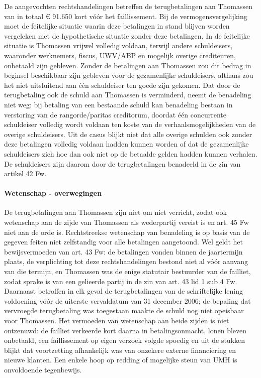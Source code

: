 \documentclass[
  dutch,
  a4paper,
]{article}
\begin{document}
De aangevochten rechtshandelingen betreffen de terugbetalingen aan Thomassen van in totaal € 91.650 kort vóór het faillissement. Bij de vermogensvergelijking moet de feitelijke situatie waarin deze betalingen in stand blijven worden vergeleken met de hypothetische situatie zonder deze betalingen. In de feitelijke situatie is Thomassen vrijwel volledig voldaan, terwijl andere schuldeisers, waaronder werknemers, fiscus, UWV/ABP en mogelijk overige crediteuren, onbetaald zijn gebleven. Zonder de betalingen aan Thomassen zou dit bedrag in beginsel beschikbaar zijn gebleven voor de gezamenlijke schuldeisers, althans zou het niet uitsluitend aan één schuldeiser ten goede zijn gekomen. Dat door de terugbetaling ook de schuld aan Thomassen is verminderd, neemt de benadeling niet weg: bij betaling van een bestaande schuld kan benadeling bestaan in verstoring van de rangorde/paritas creditorum, doordat één concurrente schuldeiser volledig wordt voldaan ten koste van de verhaalsmogelijkheden van de overige schuldeisers. Uit de casus blijkt niet dat alle overige schulden ook zonder deze betalingen volledig voldaan hadden kunnen worden of dat de gezamenlijke schuldeisers zich hoe dan ook niet op de betaalde gelden hadden kunnen verhalen. De schuldeisers zijn daarom door de terugbetalingen benadeeld in de zin van artikel 42 Fw.

\paragraph{Wetenschap - overwegingen}\label{wetenschap---overwegingen-73}

De terugbetalingen aan Thomassen zijn niet om niet verricht, zodat ook wetenschap aan de zijde van Thomassen als wederpartij vereist is en art. 45 Fw niet aan de orde is. Rechtstreekse wetenschap van benadeling is op basis van de gegeven feiten niet zelfstandig voor alle betalingen aangetoond. Wel geldt het bewijsvermoeden van art. 43 Fw: de betalingen vonden binnen de jaartermijn plaats, de verplichting tot deze rechtshandelingen bestond niet al vóór aanvang van die termijn, en Thomassen was de enige statutair bestuurder van de failliet, zodat sprake is van een gelieerde partij in de zin van art. 43 lid 1 sub 4 Fw. Daarnaast betroffen in elk geval de terugbetalingen van de schriftelijke lening voldoening vóór de uiterste vervaldatum van 31 december 2006; de bepaling dat vervroegde terugbetaling was toegestaan maakte de schuld nog niet opeisbaar voor Thomassen. Het vermoeden van wetenschap aan beide zijden is niet ontzenuwd: de failliet verkeerde kort daarna in betalingsonmacht, lonen bleven onbetaald, een faillissement op eigen verzoek volgde spoedig en uit de stukken blijkt dat voortzetting afhankelijk was van onzekere externe financiering en nieuwe klanten. Een enkele hoop op redding of mogelijke steun van UMH is onvoldoende tegenbewijs.
\end{document}
